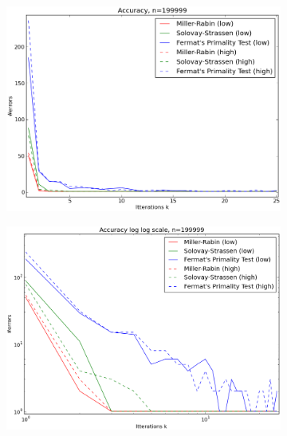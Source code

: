 \documentclass[compressed,final,notitlepage,narroweqnarray,inline,twoside,]{ieee}
\begin{document}
\begin{figure}[H]
        \centering 
        \begin{subfigure}[b]{0.45\textwidth}
                \includegraphics[width=\textwidth]{../images/Accuracy_all_exp}
        \end{subfigure}
        \begin{subfigure}[b]{0.45\textwidth}
                \includegraphics[width=\textwidth]{../images/Accuracy_all}
        \end{subfigure}
 		\vspace{0pt}
        \caption{}\label{fig:errors}
\end{figure}
\end{document}
